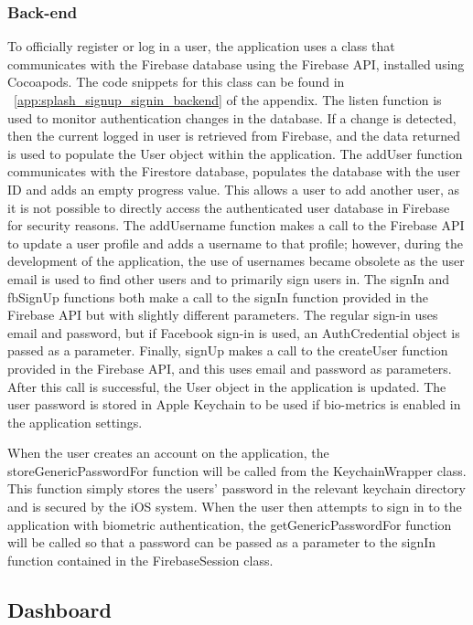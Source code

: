         \subsubsection{Back-end}
        To officially register or log in a user, the application uses a class that communicates with the Firebase database using the Firebase API, installed using Cocoapods.  The code snippets for this class can be found in ~\ref{app:splash_signup_signin_backend} of the appendix.  The listen function is used to monitor authentication changes in the database.  If a change is detected, then the current logged in user is retrieved from Firebase, and the data returned is used to populate the User object within the application. The addUser function communicates with the Firestore database, populates the database with the user ID and adds an empty progress value.  This allows a user to add another user, as it is not possible to directly access the authenticated user database in Firebase for security reasons.  The addUsername function makes a call to the Firebase API to update a user profile and adds a username to that profile; however, during the development of the application, the use of usernames became obsolete as the user email is used to find other users and to primarily sign users in. The signIn and fbSignUp functions both make a call to the signIn function provided in the Firebase API but with slightly different parameters.  The regular sign-in uses email and password, but if Facebook sign-in is used, an AuthCredential object is passed as a parameter.  Finally, signUp makes a call to the createUser function provided in the Firebase API, and this uses email and password as parameters.  After this call is successful, the User object in the application is updated. The user password is stored in Apple Keychain to be used if bio-metrics is enabled in the application settings.
        
        When the user creates an account on the application, the storeGenericPasswordFor function will be called from the KeychainWrapper class.  This function simply stores the users' password in the relevant keychain directory and is secured by the iOS system.  When the user then attempts to sign in to the application with biometric authentication, the getGenericPasswordFor function will be called so that a password can be passed as a parameter to the signIn function contained in the FirebaseSession class.
        
        \subsection{Dashboard}
